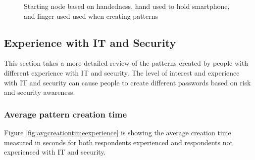 \begin{figure}[H]
{          \label{fig:handednessstartingpoint3}
        }
        \hspace{0.5cm}
        \caption{Starting node based on handedness, hand used to hold smartphone, and finger used used when creating patterns}
        \label{fig:handednessstartingpoint}
      \end{figure}

  \clearpage
	\subsection{Experience with IT and Security}


  This section takes a more detailed review of the patterns created by people with different experience with IT and security. The level of interest and experience with IT and security can cause people to create different passwords based on risk and security awareness. 

    \subsubsection{Average pattern creation time}

      Figure \ref{fig:avgcreationtimeexperience} is showing the average creation time measured in seconds for both respondents experienced and respondents not experienced with IT and security. 

